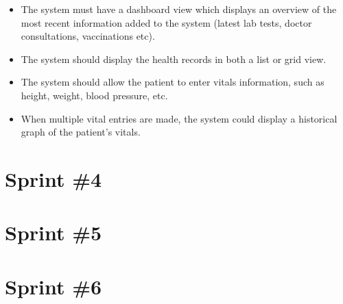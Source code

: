 \begin{itemize}
    \item The system must have a dashboard view which displays an overview of the most recent information added to the system (latest lab tests, doctor consultations, vaccinations etc).
    \item The system should display the health records in both a list or grid view.
    \item The system should allow the patient to enter vitals information, such as height, weight, blood pressure, etc.
    \item When multiple vital entries are made, the system could display a historical graph of the patient's vitals.
\end{itemize}

\section{Sprint \#4}

\section{Sprint \#5}

\section{Sprint \#6}